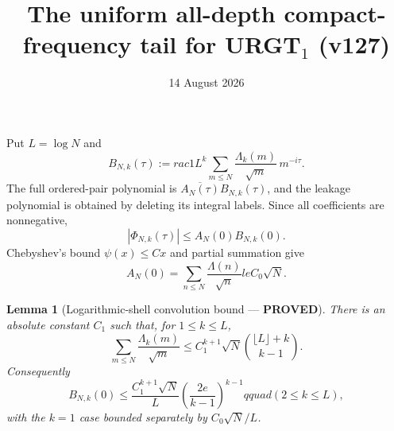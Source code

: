 \documentclass[11pt]{article}
\title{The uniform all-depth compact-frequency tail for URGT$_1$ (v127)}
\date{14 August 2026}
\newcommand{\PROVED}{\textcolor{green!40!black}{\textbf{PROVED}}}
\newtheorem{lemma}{Lemma}
\begin{document}
\maketitle

Put $L=\log N$ and
\begin{equation}
 B_{N,k}(\tau):=rac1{L^k}
 \sum_{m\le N}\frac{\Lambda_k(m)}{\sqrt m}\,m^{-i\tau}.
                                                                    \tag{1}
\end{equation}
The full ordered-pair polynomial is
$\overline{A_N(\tau)}B_{N,k}(\tau)$, and the leakage polynomial is
obtained by deleting its integral labels.  Since all coefficients are
nonnegative,
\begin{equation}
 |\Phi_{N,k}(\tau)|
 \le A_N(0)B_{N,k}(0).                                    \tag{2}
\end{equation}
Chebyshev's bound $\psi(x)\le Cx$ and partial summation give
\begin{equation}
 A_N(0)=\sum_{n\le N}\frac{\Lambda(n)}{\sqrt n}le C_0\sqrt N.
                                                                    \tag{3}
\end{equation}

\begin{lemma}[Logarithmic-shell convolution bound --- \PROVED]
There is an absolute constant $C_1$ such that, for $1\le k\le L$,
\begin{equation}
 \sum_{m\le N}\frac{\Lambda_k(m)}{\sqrt m}
 \le
 C_1^{k+1}\sqrt N
 \binom{\lfloor L\rfloor+k}{k-1}.                         \tag{4}
\end{equation}
Consequently
\begin{equation}
 B_{N,k}(0)
 \le\frac{C_1^{k+1}\sqrt N}{L}
 \left(\frac{2e}{k-1}\right)^{k-1}qquad(2\le k\le L),   \tag{5}
\end{equation}
with the $k=1$ case bounded separately by $C_0\sqrt N/L$.
\end{lemma}
\end{document}
